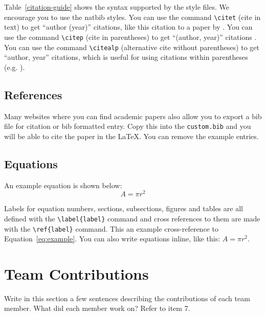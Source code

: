 \documentclass[11pt]{article}
\begin{document}
Table~\ref{citation-guide} shows the syntax supported by the style files.
We encourage you to use the natbib styles.
You can use the command \verb|\citet| (cite in text) to get ``author (year)'' citations, like this citation to a paper by \citet{Gusfield:97}.
You can use the command \verb|\citep| (cite in parentheses) to get ``(author, year)'' citations \citep{Gusfield:97}.
You can use the command \verb|\citealp| (alternative cite without parentheses) to get ``author, year'' citations, which is useful for using citations within parentheses (e.g. \citealp{Gusfield:97}).

\subsection{References}

\nocite{Ando2005,andrew2007scalable,rasooli-tetrault-2015}

Many websites where you can find academic papers also allow you to export a bib file for citation or bib formatted entry. Copy this into the \texttt{custom.bib} and you will be able to cite the paper in the \LaTeX{}. You can remove the example entries.

\subsection{Equations}

An example equation is shown below:
\begin{equation}
  \label{eq:example}
  A = \pi r^2
\end{equation}

Labels for equation numbers, sections, subsections, figures and tables
are all defined with the \verb|\label{label}| command and cross references
to them are made with the \verb|\ref{label}| command.
This an example cross-reference to Equation~\ref{eq:example}. You can also write equations inline, like this: $A=\pi r^2$.



\section*{Team Contributions}

Write in this section a few sentences describing the contributions of each team member. What did each member work on? Refer to item 7.

%





\end{document}

